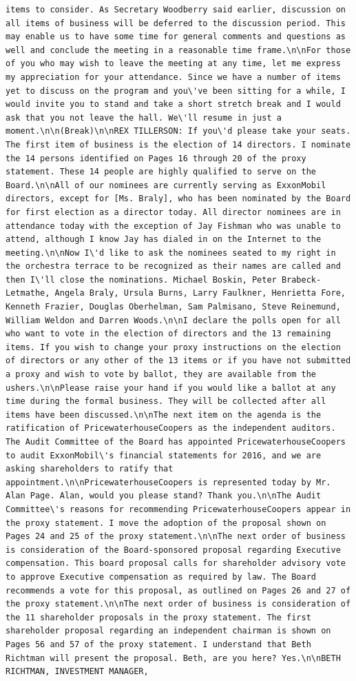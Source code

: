 \documentclass[
  letterpaper,
  DIV=11,
  numbers=noendperiod]{scrreprt}
\begin{document}
\begin{verbatim}
items to consider. As Secretary Woodberry said earlier, discussion on all items of business will be deferred to the discussion period. This may enable us to have some time for general comments and questions as well and conclude the meeting in a reasonable time frame.\n\nFor those of you who may wish to leave the meeting at any time, let me express my appreciation for your attendance. Since we have a number of items yet to discuss on the program and you\'ve been sitting for a while, I would invite you to stand and take a short stretch break and I would ask that you not leave the hall. We\'ll resume in just a moment.\n\n(Break)\n\nREX TILLERSON: If you\'d please take your seats. The first item of business is the election of 14 directors. I nominate the 14 persons identified on Pages 16 through 20 of the proxy statement. These 14 people are highly qualified to serve on the Board.\n\nAll of our nominees are currently serving as ExxonMobil directors, except for [Ms. Braly], who has been nominated by the Board for first election as a director today. All director nominees are in attendance today with the exception of Jay Fishman who was unable to attend, although I know Jay has dialed in on the Internet to the meeting.\n\nNow I\'d like to ask the nominees seated to my right in the orchestra terrace to be recognized as their names are called and then I\'ll close the nominations. Michael Boskin, Peter Brabeck-Letmathe, Angela Braly, Ursula Burns, Larry Faulkner, Henrietta Fore, Kenneth Frazier, Douglas Oberhelman, Sam Palmisano, Steve Reinemund, William Weldon and Darren Woods.\n\nI declare the polls open for all who want to vote in the election of directors and the 13 remaining items. If you wish to change your proxy instructions on the election of directors or any other of the 13 items or if you have not submitted a proxy and wish to vote by ballot, they are available from the ushers.\n\nPlease raise your hand if you would like a ballot at any time during the formal business. They will be collected after all items have been discussed.\n\nThe next item on the agenda is the ratification of PricewaterhouseCoopers as the independent auditors. The Audit Committee of the Board has appointed PricewaterhouseCoopers to audit ExxonMobil\'s financial statements for 2016, and we are asking shareholders to ratify that appointment.\n\nPricewaterhouseCoopers is represented today by Mr. Alan Page. Alan, would you please stand? Thank you.\n\nThe Audit Committee\'s reasons for recommending PricewaterhouseCoopers appear in the proxy statement. I move the adoption of the proposal shown on Pages 24 and 25 of the proxy statement.\n\nThe next order of business is consideration of the Board-sponsored proposal regarding Executive compensation. This board proposal calls for shareholder advisory vote to approve Executive compensation as required by law. The Board recommends a vote for this proposal, as outlined on Pages 26 and 27 of the proxy statement.\n\nThe next order of business is consideration of the 11 shareholder proposals in the proxy statement. The first shareholder proposal regarding an independent chairman is shown on Pages 56 and 57 of the proxy statement. I understand that Beth Richtman will present the proposal. Beth, are you here? Yes.\n\nBETH RICHTMAN, INVESTMENT MANAGER, 
\end{verbatim}
\end{document}
